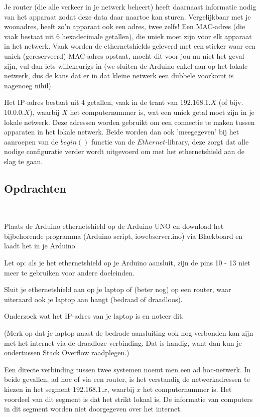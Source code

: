 Je router (die alle verkeer in je netwerk beheert) heeft daarnaast informatie nodig van het apparaat zodat deze data daar naartoe kan sturen. Vergelijkbaar met je woonadres, heeft zo'n apparaat ook een adres, twee zelfs! Een MAC-adres (die vaak bestaat uit 6 hexadecimale getallen), die uniek moet zijn voor elk apparaat in het netwerk. Vaak worden de ethernetshields geleverd met een sticker waar een uniek (gereserveerd) MAC-adres opstaat, mocht dit voor jou nu niet het geval zijn, vul dan iets willekeurigs in (we sluiten de Arduino enkel aan op het lokale netwerk, dus de kans dat er in dat kleine netwerk een dubbele voorkomt is nagenoeg nihil). 

Het IP-adres bestaat uit 4 getallen, vaak in de trant van $192.168.1.X$ (of bijv. $10.0.0.X$), waarbij $X$ het computernummer is, wat een uniek getal moet zijn in je lokale netwerk. Deze adressen worden gebruikt om een connectie te maken tussen apparaten in het lokale netwerk. Beide worden dan ook 'meegegeven' bij het aanroepen van de $begin()$ functie van de $Ethernet$-library, deze zorgt dat alle nodige configuratie verder wordt uitgevoerd om met het ethernetshield aan de slag te gaan.

\subsection{Opdrachten}
\ 

\begin{exercise}
Plaats de Arduino ethernetshield op de Arduino UNO en download het bijbehorende programma (Arduino script, iowebserver.ino) via Blackboard en laadt het in je Arduino.
\end{exercise}

\begin{remark}
Let op: als je het ethernetshield op je Arduino aansluit, zijn de pins 10 - 13 niet meer te gebruiken voor andere doeleinden.
\end{remark}

\begin{exercise}
Sluit je ethernetshield aan op je laptop of (beter nog) op een router, waar uiteraard ook je laptop aan hangt (bedraad of draadloos).

Onderzoek wat het IP-adres van je laptop is en noteer dit.  

(Merk op dat je laptop naast de bedrade aansluiting ook nog verbonden kan zijn met het internet via de draadloze verbinding. Dat is handig, want dan kun je ondertussen Stack Overflow raadplegen.)  

Een directe verbinding tussen twee systemen noemt men een ad hoc-netwerk. In beide gevallen, ad hoc of via een router, is het verstandig de netwerkadressen te kiezen in het segment $192.168.1.x$, waarbij $x$ het computernummer is. Het voordeel van dit segment is dat het strikt lokaal is. De informatie van computers in dit segment worden niet doorgegeven over het internet. 
\end{exercise}

